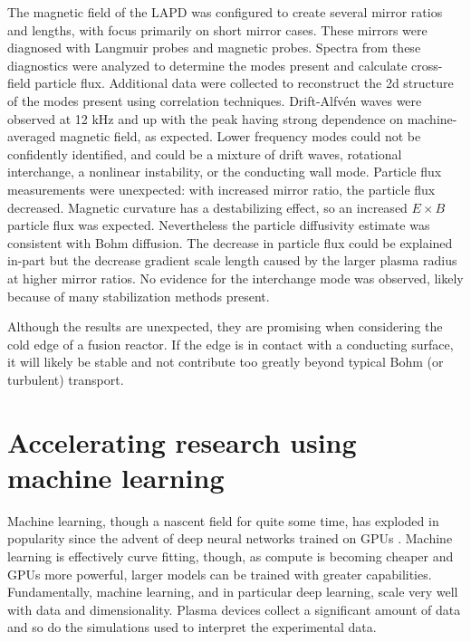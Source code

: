 The magnetic field of the LAPD was configured to create several mirror ratios and lengths, with focus primarily on short mirror cases. These mirrors were diagnosed with Langmuir probes and magnetic probes. Spectra from these diagnostics were analyzed to determine the modes present and calculate cross-field particle flux. Additional data were collected to reconstruct the 2d structure of the modes present using correlation techniques. Drift-Alfv\'en waves were observed at 12 kHz and up with the peak having strong dependence on machine-averaged magnetic field, as expected. Lower frequency modes could not be confidently identified, and could be a mixture of drift waves, rotational interchange, a nonlinear instability, or the conducting wall mode. Particle flux measurements were unexpected: with increased mirror ratio, the particle flux decreased. Magnetic curvature has a destabilizing effect, so an increased $E \times B$ particle flux was expected. Nevertheless the particle diffusivity estimate was consistent with Bohm diffusion. The decrease in particle flux could be explained in-part but the decrease gradient scale length caused by the larger plasma radius at higher mirror ratios. No evidence for the interchange mode was observed, likely because of many stabilization methods present.

Although the results are unexpected, they are promising when considering the cold edge of a fusion reactor. If the edge is in contact with a conducting surface, it will likely be stable and not contribute too greatly beyond typical Bohm (or turbulent) transport. 

\section{Accelerating research using machine learning}

Machine learning, though a nascent field for quite some time, has exploded in popularity since the advent of deep neural networks trained on GPUs \cite{krizhevsky_imagenet_2017}. Machine learning is effectively curve fitting, though, as compute is becoming cheaper and GPUs more powerful, larger models can be trained with greater capabilities. Fundamentally, machine learning, and in particular deep learning, scale very well with data and dimensionality. Plasma devices collect a significant amount of data and so do the simulations used to interpret the experimental data.

